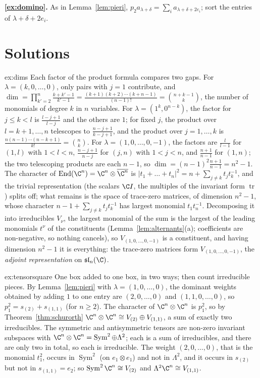 \noindent\textbf{\ref{ex:domino}.} As in Lemma~\ref{lem:pieri}, $p_2a_{\lambda+\delta}=\sum_ia_{\lambda+\delta+2e_i}$; sort the entries of $\lambda+\delta+2e_i$.

\section{Solutions}

\begin{solution}{ex:dims}
\idea Each factor of the product formula compares two gaps.
\writeup For $\lambda=(k,0,\dots,0)$, only pairs with $j=1$ contribute, and $\dim=\prod_{k'=2}^n\frac{k+k'-1}{k'-1}=\frac{(k+1)(k+2)\cdots(k+n-1)}{(n-1)!}=\binom{n+k-1}k$, the number of monomials of degree $k$ in $n$ variables. For $\lambda=(1^k,0^{n-k})$, the factor for
$j\le k<l$ is $\frac{l-j+1}{l-j}$ and the others are $1$; for fixed $j$, the product over $l=k+1,\dots,n$ telescopes to $\frac{n-j+1}{k-j+1}$, and the product over $j=1,\dots,k$ is $\frac{n(n-1)\cdots(n-k+1)}{k!}=\binom nk$. For $\lambda=(1,0,\dots,0,-1)$, the
factors are $\frac{l}{l-1}$ for $(1,l)$ with $1<l<n$, $\frac{n-j+1}{n-j}$ for $(j,n)$ with $1<j<n$, and $\frac{n+1}{n-1}$ for $(1,n)$; the two telescoping products are each $n-1$, so $\dim=(n-1)^2\frac{n+1}{n-1}=n^2-1$. The character of $\operatorname{End}(\C^n)=\C^n\otimes\overline{\C^n}$ is
$|t_1+\dots+t_n|^2=n+\sum_{j\ne k}t_jt_k^{-1}$, and the trivial representation (the scalars $\C I$, the multiples of the invariant form $\operatorname{tr}$) splits off; what remains is the space of trace-zero matrices, of dimension $n^2-1$, whose character
$n-1+\sum_{j\ne k}t_jt_k^{-1}$ has largest monomial $t_1t_n^{-1}$. Decomposing it into irreducibles $V_\nu$, the largest monomial of the sum is the largest of the leading monomials $t^\nu$ of the constituents (Lemma~\ref{lem:alternants}(a); coefficients are non-negative, so nothing cancels), so $V_{(1,0,\dots,0,-1)}$ is a constituent, and having dimension $n^2-1$ it is everything: the trace-zero matrices form $V_{(1,0,\dots,0,-1)}$, the \emph{adjoint representation} on $\mathfrak{sl}_n(\C)$.
\end{solution}

\begin{solution}{ex:tensorsquare}
\idea One box added to one box, in two ways; then count irreducible pieces.
\writeup By Lemma~\ref{lem:pieri} with $\lambda=(1,0,\dots,0)$, the dominant weights obtained by adding $1$ to one entry are $(2,0,\dots,0)$ and $(1,1,0,\dots,0)$, so $p_1^2=s_{(2)}+s_{(1,1)}$ (for $n\ge2$). The character of $\C^n\otimes\C^n$ is $p_1^2$, so by Theorem~\ref{thm:schurorth}
$\C^n\otimes\C^n\cong V_{(2)}\oplus V_{(1,1)}$, a sum of exactly two irreducibles. The symmetric and antisymmetric tensors are non-zero invariant subspaces with $\C^n\otimes\C^n=\operatorname{Sym}^2\oplus\Lambda^2$; each is a sum of irreducibles, and there are only two in total, so each is
irreducible. The weight $(2,0,\dots,0)$, that is the monomial $t_1^2$, occurs in $\operatorname{Sym}^2$ (on $e_1\otimes e_1$) and not in $\Lambda^2$, and it occurs in $s_{(2)}$ but not in $s_{(1,1)}=e_2$; so $\operatorname{Sym}^2\C^n\cong V_{(2)}$ and $\Lambda^2\C^n\cong V_{(1,1)}$.
\end{solution}


